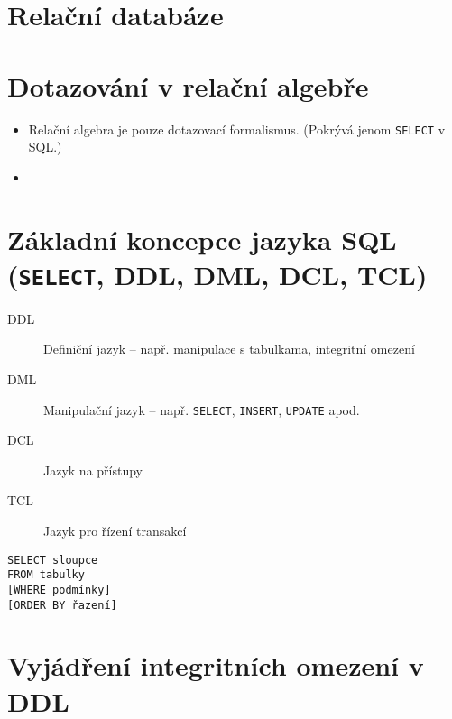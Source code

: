 \documentclass{szzclass}
\begin{document}
\section{Relační databáze}
\section{Dotazování v relační algebře}
\begin{itemize}
  \item Relační algebra je pouze dotazovací formalismus. (Pokrývá jenom \texttt{SELECT} v SQL.)
  \item 
\end{itemize}
\section{Základní koncepce jazyka SQL (\texttt{SELECT}, DDL, DML, DCL, TCL)}
\begin{description}
  \item[DDL] Definiční jazyk -- např. manipulace s tabulkama, integritní omezení
  \item[DML] Manipulační jazyk -- např. \texttt{SELECT}, \texttt{INSERT}, \texttt{UPDATE} apod.
  \item[DCL] Jazyk na přístupy
  \item[TCL] Jazyk pro řízení transakcí
\end{description}

\begin{verbatim}
SELECT sloupce
FROM tabulky
[WHERE podmínky]
[ORDER BY řazení]
\end{verbatim}

\section{Vyjádření integritních omezení v DDL}
\end{document}
